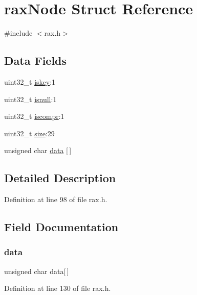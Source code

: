 \hypertarget{structrax_node}{}\section{rax\+Node Struct Reference}
\label{structrax_node}


{\ttfamily \#include $<$rax.\+h$>$}

\subsection*{Data Fields}
\begin{DoxyCompactItemize}
\item 
uint32\+\_\+t \hyperlink{structrax_node_ad11d2993e802c844bfdf827ebce7907d}{iskey}\+:1
\item 
uint32\+\_\+t \hyperlink{structrax_node_a9301700c1338965475354cc876ccdf6f}{isnull}\+:1
\item 
uint32\+\_\+t \hyperlink{structrax_node_a1b7f71444b8d20355b174737095f3e65}{iscompr}\+:1
\item 
uint32\+\_\+t \hyperlink{structrax_node_ab2c6b258f02add8fdf4cfc7c371dd772}{size}\+:29
\item 
unsigned char \hyperlink{structrax_node_ad22557485286d9df959ff3335001ce69}{data} \mbox{[}$\,$\mbox{]}
\end{DoxyCompactItemize}


\subsection{Detailed Description}


Definition at line 98 of file rax.\+h.



\subsection{Field Documentation}
\mbox{\label{structrax_node_ad22557485286d9df959ff3335001ce69}} 
\subsubsection{\texorpdfstring{data}{data}}
{\footnotesize\ttfamily unsigned char data\mbox{[}$\,$\mbox{]}}



Definition at line 130 of file rax.\+h.

